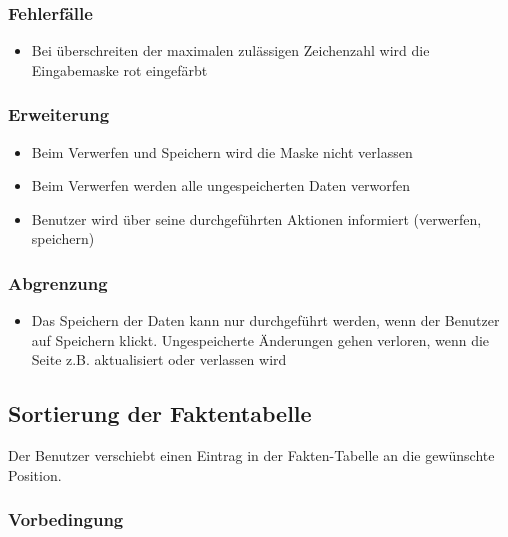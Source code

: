 \documentclass[a4paper,12pt]{article}
\begin{document}
\subsubsection{Fehlerfälle}\label{fehlerfalle-8}

\begin{itemize}

\item
  Bei überschreiten der maximalen zulässigen Zeichenzahl wird die
  Eingabemaske rot eingefärbt
\end{itemize}

\subsubsection{Erweiterung}\label{erweiterung-8}

\begin{itemize}

\item
  Beim Verwerfen und Speichern wird die Maske nicht verlassen
\item
  Beim Verwerfen werden alle ungespeicherten Daten verworfen
\item
  Benutzer wird über seine durchgeführten Aktionen informiert
  (verwerfen, speichern)
\end{itemize}

\subsubsection{Abgrenzung}\label{abgrenzung-8}

\begin{itemize}

\item
  Das Speichern der Daten kann nur durchgeführt werden, wenn der
  Benutzer auf Speichern klickt. Ungespeicherte Änderungen gehen
  verloren, wenn die Seite z.B. aktualisiert oder verlassen wird
\end{itemize}

\clearpage

\subsection{Sortierung der Faktentabelle}\label{benutzer-verschiebt-einen-eintrag-in-der-fakten-tabelle}
Der Benutzer verschiebt einen Eintrag in der Fakten-Tabelle an die gewünschte Position.

\subsubsection{Vorbedingung}\label{vorbedingung-9}
\end{document}
